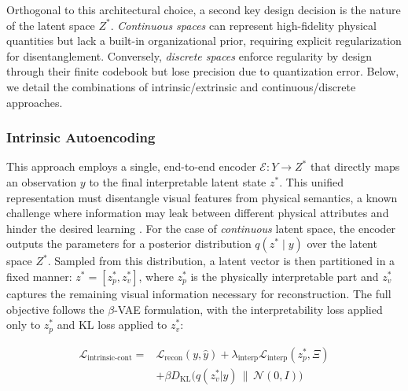 \documentclass[sigconf]{acmart}
\begin{document}
Orthogonal to this architectural choice, a second key design decision is the nature of the latent space \(Z^*\). \emph{Continuous spaces} can represent high-fidelity physical quantities but lack a built-in organizational prior, requiring explicit regularization for disentanglement. Conversely, \emph{discrete spaces} enforce regularity by design through their finite codebook but lose precision due to quantization error.
Below, we detail the combinations of intrinsic/extrinsic and continuous/discrete approaches. 

\subsubsection{Intrinsic Autoencoding}



This approach employs a single, end-to-end encoder \(\mathcal{E}: Y \to Z^*\) that directly maps an observation \(y\) to the final interpretable latent state \(z^*\). This unified representation must disentangle visual features from physical semantics, a known challenge where information may leak between different physical attributes and hinder the desired learning \cite[]{peper2025four}.
For the case of \textit{continuous} latent space, the encoder outputs the parameters for a posterior distribution \(q(z^*\mid y)\) over the latent space \(Z^*\). Sampled from this distribution, a latent vector is then partitioned in a fixed manner:  \(z^* = [z_p^*, z_v^*]\), where \(z_p^*\) is the physically interpretable part and \(z_v^*\) captures the remaining visual information necessary for reconstruction. The full objective follows the \(\beta\)-VAE formulation, with the interpretability loss applied only to \(z_p^*\) and KL loss applied to $z_v^*$:

\begin{equation}
\begin{split}
    \mathcal{L}_{\text{intrinsic-cont}} = &\mathcal{L}_{\text{recon}}(y, \hat{y}) + \lambda_{\text{interp}}\mathcal{L}_{\text{interp}}(z_p^*, \Xi) \\
    &+ \beta D_{\text{KL}}\big(q(z_v^*|y) \,\|\, \mathcal{N}(0, I)\big)
\end{split}
\end{equation}
\end{document}
